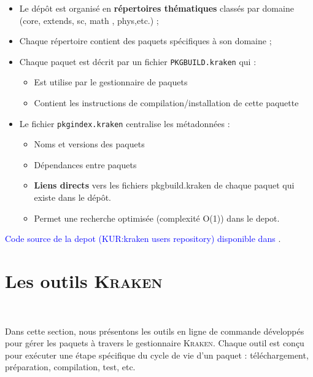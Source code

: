 \begin{itemize}
    \item Le dépôt est organisé en \textbf{répertoires thématiques} classés par domaine (core, extends, sc, math , phys,etc.) ;
    \item Chaque répertoire contient des paquets spécifiques à son domaine ;
    \item Chaque paquet est décrit par un fichier \texttt{PKGBUILD.kraken} qui :
    \begin{itemize}
        \item Est utilise par le gestionnaire de paquets
        \item Contient les instructions de compilation/installation de cette paquette
    \end{itemize}
    \item Le fichier \texttt{pkgindex.kraken} centralise les métadonnées :
    \begin{itemize}
        \item Noms et versions des paquets
        \item Dépendances entre paquets
       \item \textbf{Liens directs} vers les fichiers pkgbuild.kraken de chaque paquet qui existe dans le dépôt.

        \item Permet une recherche optimisée (complexité O(1)) dans le depot.
    \end{itemize}
\end{itemize}





\textcolor{blue}{Code source de la depot (KUR:kraken users repository) disponible dans  \cite{depot_kur}}.
\section{Les outils \textsc{Kraken}}
\label{subsec:kraken-tools}


\











Dans cette section, nous présentons les outils en ligne de commande développés pour gérer les paquets à travers le gestionnaire \textsc{Kraken}. Chaque outil est conçu pour exécuter une étape spécifique du cycle de vie d’un paquet : téléchargement, préparation, compilation, test, etc.


